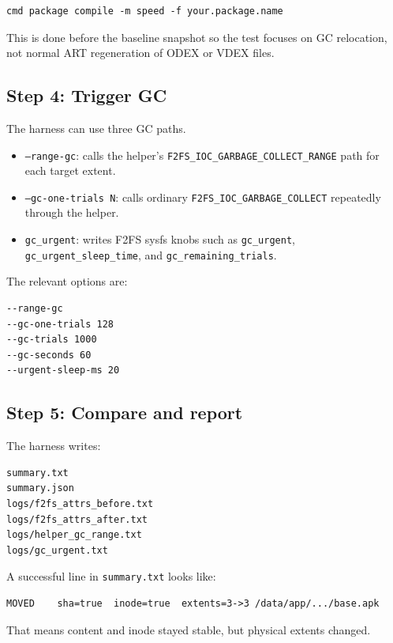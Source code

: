 \documentclass[11pt]{article}
\begin{document}
\begin{verbatim}
cmd package compile -m speed -f your.package.name
\end{verbatim}

This is done before the baseline snapshot so the test focuses on GC relocation,
not normal ART regeneration of ODEX or VDEX files.

\subsection{Step 4: Trigger GC}

The harness can use three GC paths.

\begin{itemize}
\item \texttt{--range-gc}: calls the helper's
      \texttt{F2FS\_IOC\_GARBAGE\_COLLECT\_RANGE} path for each target extent.
\item \texttt{--gc-one-trials N}: calls ordinary
      \texttt{F2FS\_IOC\_GARBAGE\_COLLECT} repeatedly through the helper.
\item \texttt{gc\_urgent}: writes F2FS sysfs knobs such as
      \texttt{gc\_urgent}, \texttt{gc\_urgent\_sleep\_time}, and
      \texttt{gc\_remaining\_trials}.
\end{itemize}

The relevant options are:

\begin{verbatim}
--range-gc
--gc-one-trials 128
--gc-trials 1000
--gc-seconds 60
--urgent-sleep-ms 20
\end{verbatim}

\subsection{Step 5: Compare and report}

The harness writes:

\begin{verbatim}
summary.txt
summary.json
logs/f2fs_attrs_before.txt
logs/f2fs_attrs_after.txt
logs/helper_gc_range.txt
logs/gc_urgent.txt
\end{verbatim}

A successful line in \texttt{summary.txt} looks like:

\begin{verbatim}
MOVED    sha=true  inode=true  extents=3->3 /data/app/.../base.apk
\end{verbatim}

That means content and inode stayed stable, but physical extents changed.
\end{document}
